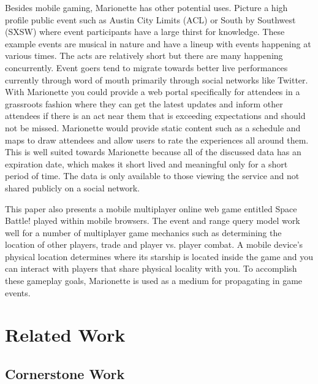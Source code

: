 \documentclass[12pt]{report}	%
\theoremstyle{definition}
\theoremstyle{remark}
\begin{document}
Besides mobile gaming, Marionette has other potential uses. Picture a
high profile public event such as Austin City Limits (ACL) or South by
Southwest (SXSW) where event participants have a large thirst for
knowledge. These example events are musical in nature and have a lineup
with events happening at various times. The acts are relatively short
but there are many happening concurrently. Event goers tend to migrate
towards better live performances currently through word of mouth
primarily through social networks like Twitter. With Marionette you
could provide a web portal specifically for attendees in a grassroots
fashion where they can get the latest updates and inform other attendees
if there is an act near them that is exceeding expectations and should
not be missed. Marionette would provide static content such as a
schedule and maps to draw attendees and allow users to rate the
experiences all around them. This is well suited towards Marionette
because all of the discussed data has an expiration date, which makes it
short lived and meaningful only for a short period of time. The data is
only available to those viewing the service and not shared publicly on a
social network.

This paper also presents a mobile multiplayer online web game entitled
Space Battle! played within mobile browsers. The event and range query
model work well for a number of multiplayer game mechanics such as
determining the location of other players, trade and player vs. player
combat. A mobile device's physical location determines where its
starship is located inside the game and you can interact with players
that share physical locality with you. To accomplish these gameplay
goals, Marionette is used as a medium for propagating in game events.

\chapter{Related Work}

\section{Cornerstone Work}
\end{document}
